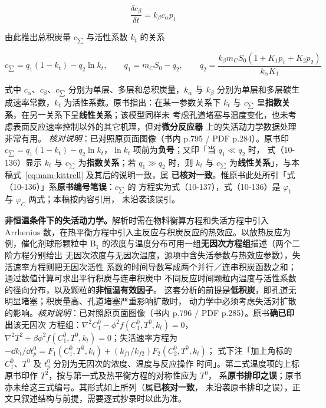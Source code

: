 \begin{equation}
\frac{\delta c_\beta}{\delta t}=k_\beta c_\alpha p_1
\label{eq:multilayer-coke}
\end{equation}

由此推出总积炭量 $c_\sum$ 与活性系数 $k_t$ 的关系

\begin{equation}
c_\sum=q_1(1-k_t)-q_2\ln k_t,\qquad
q_1=m_CS_0-q_2,\qquad
q_2=\frac{k_\beta m_CS_0(1+K_1p_1+K_2p_2)}{k_\alpha K_1}
\label{eq:nam-kittrell}
\end{equation}

式中 $c_\alpha$、$c_\beta$、$c_\sum$ 分别为单层、多层和总积炭量，$k_\alpha$ 与
$k_\beta$ 分别为单层和多层碳生成速率常数，$k_t$ 为活性系数。原书指出：在某一参数关系下
$k_t$ 与 $c_\sum$ 呈\textbf{指数关系}，在另一关系下呈\textbf{线性关系}；该模型同样未
考虑孔道堵塞与温度变化，也未考虑表面反应速率控制以外的其它机理，但对\textbf{微分反应器}
上的失活动力学数据处理非常有用。
\emph{核对说明}：已对照原页面图像（书内 p.795 / PDF p.284）。原书印
$c_\sum=q_1(1-k_t)-q_2\ln k_t$，$\ln k_t$ 项前为\textbf{负号}；又印「当 $q_1\ll q_2$ 时，
式（10-136）显示 $k_t$ 与 $c_\sum$ 为\textbf{指数关系}；若 $q_1\gg q_2$ 时，则 $k_t$ 与
$c_\sum$ 为\textbf{线性关系}」，与本稿式~\eqref{eq:nam-kittrell} 及其后的说明一致，属
\textbf{已核对一致}。惟原书此处所引「式（10-136）」系\textbf{原书编号笔误}：$c_\sum$ 的
方程实为式（10-137），式（10-136）是 $\varphi_1$ 与 $\varphi_C$ 两式；本稿按内容引用，
未沿袭该误引。

\textbf{非恒温条件下的失活动力学。}解析时需在物料衡算方程和失活方程中引入 Arrhenius
数，在热平衡方程中引入主反应与积炭反应的热效应。以放热反应为例，催化剂球形颗粒中
$\mathrm{B_1}$ 的浓度与温度分布可用一组\textbf{无因次方程组}描述（两个二阶方程分别给出
无因次浓度与无因次温度，源项中含失活参数与热效应参数），失活速率方程则把无因次活性
系数的时间导数写成两个并行／连串积炭函数之和；通过数值计算可求出平行积炭与连串积炭中
不同反应时间颗粒内温度与活性系数的径向分布，以及颗粒的\textbf{非恒温有效因子}。
这套分析的前提是\textbf{低积炭}，即孔道无明显堵塞；积炭量高、孔道堵塞严重影响扩散时，
动力学中必须考虑失活对扩散的影响。\emph{核对说明}：已对照原页面图像（书内 p.796 / PDF p.285）。原书\textbf{确已印出}该无因次
方程组：$\nabla^{2}C_1^{0}-\phi^{2}f(C_1^{0},T^{0},k_t)=0$，
$\nabla^{2}T^{2}+\beta\phi^{2}f(C_1^{0},T^{0},k_t)=0$；失活速率方程为
$-\dd k_t/\dd t_p^{0}=F_1(C_1^{0},T^{0},k_t)+(k_{f1}/k_{f2})F_2(C_2^{0},T^{0},k_t)$；
式下注「加上角标的 $C_1^{0}$、$T^{0}$ 及 $t_p^{0}$ 分别为无因次的浓度、温度与反应操作
时间」。第二式温度项的上标原书印作 $T^{2}$，按与第一式及热平衡方程的对称性应为 $T^{0}$，
系\textbf{原书排印之误}；原书亦未给这三式编号。其形式如上所列（属\textbf{已核对一致}，
未沿袭原书排印之误），正文只叙述结构与前提，需要逐式抄录时以此为准。

